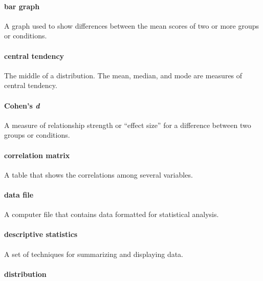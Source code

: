 \documentclass[
]{krantz}
\begin{document}
\paragraph*{bar graph}\label{bar-graph-2}

A graph used to show differences between the mean scores of two or more groups or conditions.

\paragraph*{central tendency}\label{central-tendency-1}

The middle of a distribution. The mean, median, and mode are measures of central tendency.

\paragraph*{\texorpdfstring{Cohen's \emph{d}}{Cohen's d}}\label{cohens-d}

A measure of relationship strength or ``effect size'' for a difference between two groups or conditions.

\paragraph*{correlation matrix}\label{correlation-matrix-1}

A table that shows the correlations among several variables.

\paragraph*{data file}\label{data-file}

A computer file that contains data formatted for statistical analysis.

\paragraph*{descriptive statistics}\label{descriptive-statistics-1}

A set of techniques for summarizing and displaying data.

\paragraph*{distribution}\label{distribution}
\end{document}
